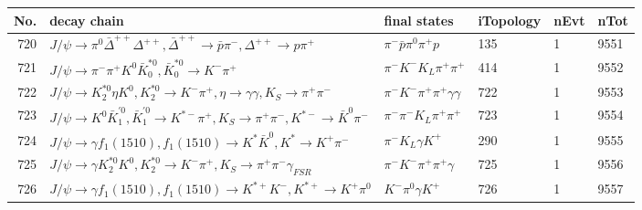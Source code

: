 \begin{table}[htbp] 
\begin{center}
\begin{small}
\begin{tabular}{rlllll}\hline\hline
 No. & decay chain & final states &  iTopology & nEvt & nTot \\\hline
720&$J/\psi       \rightarrow \pi^{0}        \bar{\Delta}^{++}\Delta^{++}       , \bar{\Delta}^{++} \rightarrow \bar{p}          \pi^{-}        , \Delta^{++}        \rightarrow p                 \pi^{+}        $&$\pi^{-}        \bar{p}          \pi^{0}        \pi^{+}        p                 $&  135&    1& 9551\\
721&$J/\psi       \rightarrow \pi^{-}        \pi^{+}        K^{0}          \bar{K}_0^{*0}, \bar{K}_0^{*0} \rightarrow K^{-}          \pi^{+}        $&$\pi^{-}        K^{-}          K_{L}          \pi^{+}        \pi^{+}        $&  414&    1& 9552\\
722&$J/\psi       \rightarrow K_2^{*0}       \eta          K^{0}          , K_2^{*0}        \rightarrow K^{-}          \pi^{+}        , \eta           \rightarrow \gamma       \gamma       , K_{S}           \rightarrow \pi^{+}        \pi^{-}        $&$\pi^{-}        K^{-}          \pi^{+}        \pi^{+}        \gamma       \gamma       $&  722&    1& 9553\\
723&$J/\psi       \rightarrow K^{0}          \bar{K}_1^{'0}, \bar{K}_1^{'0} \rightarrow K^{*-}         \pi^{+}        , K_{S}           \rightarrow \pi^{+}        \pi^{-}        , K^{*-}          \rightarrow \bar{K}^{0}   \pi^{-}        $&$\pi^{-}        \pi^{-}        K_{L}          \pi^{+}        \pi^{+}        $&  723&    1& 9554\\
724&$J/\psi       \rightarrow \gamma       f_{1}(1510)    , f_{1}(1510)     \rightarrow K^{*}          \bar{K}^{0}   , K^{*}           \rightarrow K^{+}          \pi^{-}        $&$\pi^{-}        K_{L}          \gamma       K^{+}          $&  290&    1& 9555\\
725&$J/\psi       \rightarrow \gamma       K_2^{*0}       K^{0}          , K_2^{*0}        \rightarrow K^{-}          \pi^{+}        , K_{S}           \rightarrow \pi^{+}        \pi^{-}        \gamma_{FSR} $&$\pi^{-}        K^{-}          \pi^{+}        \pi^{+}        \gamma       $&  725&    1& 9556\\
726&$J/\psi       \rightarrow \gamma       f_{1}(1510)    , f_{1}(1510)     \rightarrow K^{*+}         K^{-}          , K^{*+}          \rightarrow K^{+}          \pi^{0}        $&$K^{-}          \pi^{0}        \gamma       K^{+}          $&  726&    1& 9557\\

\end{tabular}
\end{small}
\end{center}
\end{table}
